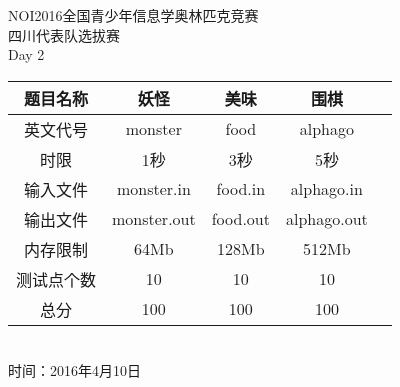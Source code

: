 \begin{center}
\xiaoyi\textsf{NOI2016全国青少年信息学奥林匹克竞赛}
~\\[120pt]
\chuhao\textsf{四川代表队选拔赛}
~\\[60pt]
\textsf{Day 2}
~\\[60pt]
\begin{spacing}{1.5}
\xiaoer
\begin{tabular}{|c|c|c|c|c|}
	\hline
	\textsf{题目名称}&\textsf{妖怪}&\textsf{美味}&\textsf{围棋}\\
	\hline
	英文代号&monster&food&alphago\\
	\hline
	时限&1秒&3秒&5秒\\
	\hline
	输入文件&monster.in&food.in&alphago.in\\
	\hline
	输出文件&monster.out&food.out&alphago.out\\
	\hline
	内存限制&64Mb&128Mb&512Mb\\
	\hline
	测试点个数&10&10&10\\
	\hline
	总分&100&100&100\\
	\hline
\end{tabular}
\end{spacing}
~\\[40pt]
\erhao\textsf{时间：2016年4月10日}
\end{center}

